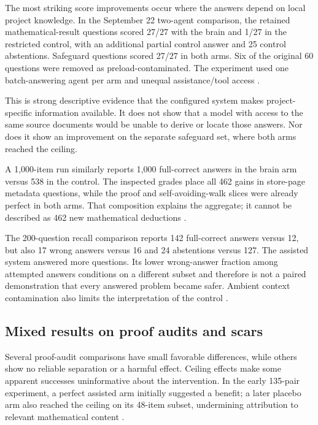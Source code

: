 The most striking score improvements occur where the answers depend on local project knowledge. In the September 22 two-agent comparison, the retained mathematical-result questions scored 27/27 with the brain and 1/27 in the restricted control, with an additional partial control answer and 25 control abstentions. Safeguard questions scored 27/27 in both arms. Six of the original 60 questions were removed as preload-contaminated. The experiment used one batch-answering agent per arm and unequal assistance/tool access \citep{twoopus}.

This is strong descriptive evidence that the configured system makes project-specific information available. It does not show that a model with access to the same source documents would be unable to derive or locate those answers. Nor does it show an improvement on the separate safeguard set, where both arms reached the ceiling.

A 1,000-item run similarly reports 1,000 full-correct answers in the brain arm versus 538 in the control. The inspected grades place all 462 gains in store-page metadata questions, while the proof and self-avoiding-walk slices were already perfect in both arms. That composition explains the aggregate; it cannot be described as 462 new mathematical deductions \citep{benchmark_onek}.

The 200-question recall comparison reports 142 full-correct answers versus 12, but also 17 wrong answers versus 16 and 24 abstentions versus 127. The assisted system answered more questions. Its lower wrong-answer fraction among attempted answers conditions on a different subset and therefore is not a paired demonstration that every answered problem became safer. Ambient context contamination also limits the interpretation of the control \citep{benchmark_recall200,benchmark_contamination}.

\subsection{Mixed results on proof audits and scars}

Several proof-audit comparisons have small favorable differences, while others show no reliable separation or a harmful effect. Ceiling effects make some apparent successes uninformative about the intervention. In the early 135-pair experiment, a perfect assisted arm initially suggested a benefit; a later placebo arm also reached the ceiling on its 48-item subset, undermining attribution to relevant mathematical content \citep{benchmark_v5,benchmark_v5raw}.

